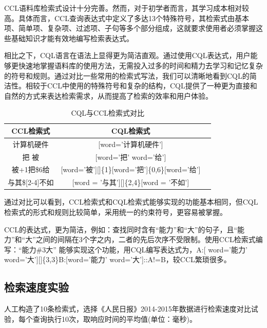 \documentclass[11pt]{article}
\begin{document}
\begin{CJK*}{UTF8}{gbsn}
CCL语料库检索式设计十分完善。然而，对于初学者而言，其学习成本相对较高。具体而言，CCL查询表达式中定义了多达13个特殊符号，其检索式由基本项、简单项、复杂项、过滤项、子句等多个部分组成，这就要求使用者必须掌握这些基础知识才能有效地编写检索表达式。

相比之下，CQL语言在语法上显得更为简洁直观。通过使用CQL表达式，用户能够更快速地掌握语料库的使用方法，无需投入过多的时间和精力去学习和记忆复杂的符号和规则。通过对比一些常用的检索式写法，我们可以清晰地看到CQL的简洁性。相较于CCL中使用的特殊符号和复杂的结构，CQL提供了一种更为直接和自然的方式来表达检索需求，从而提高了检索的效率和用户体验。

\begin{table}[h]
	\begin{center}
		\begin{tabular}{|c|c|c|}
			\hline \bf CCL检索式 & \bf CQL检索式 \\ \hline
			计算机硬件 & [word='计算机硬件'] \\
			把 \textbar 被 & [word='把' \textbar word='给'] \\
			被+1把\$6给 & [word='被'][]\{1\}[word='把']\{0,6\}[word='给'] \\
			与其\$[2-4]不如 & [word = '与其'][]\{2,4\}[word = '不如'] \\
			
			\hline
		\end{tabular}
	\end{center}
	\caption{\label{font-table} CQL与CCL检索式对比}
\end{table}

通过对比可以看到，CCL检索式和CQL检索式能够实现的功能基本相同，但CQL检索式的形式和规则比较简单，采用统一的约束符号，更容易被掌握。

CCL的表达式，更为简洁，例如：查找同时含有“能力”和“大”的句子，且“能力”和“大”之间的间隔在3个字之内，二者的先后次序不受限制。使用CCL检索式编写：“能力\#3大” 能够实现这个功能，用CQL编写表达式为，A:[ word='能力' \textbar word='大'][]\{3,3\}B:[word='能力' \textbar word='大']::A!=B，较CCL繁琐很多。

\subsection{检索速度实验}

人工构造了10条检索式，选择《人民日报》2014-2015年数据进行检索速度对比试验，每个查询执行10次，取响应时间的平均值(单位：毫秒)。


\end{CJK*}
\end{document}
